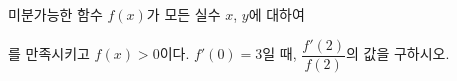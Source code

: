 미분가능한 함수 $f(x)$가 모든 실수 $x$, $y$에 대하여 \par\smallskip{}\par\smallskip\noindent 를 만족시키고 $f(x)>0$이다. $f'(0)=3$일 때, $\dfrac{f'(2)}{f(2)}$의 값을 구하시오.
